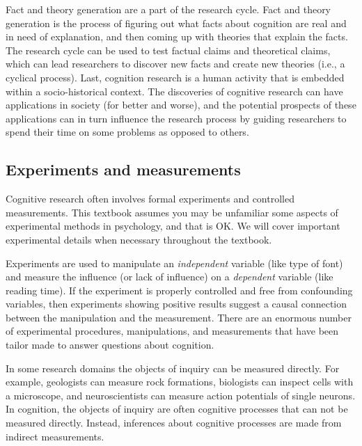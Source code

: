 \documentclass[
  oneside,
  12pt]{crumpbook}
\begin{document}
Fact and theory generation are a part of the research cycle. Fact and theory generation is the process of figuring out what facts about cognition are real and in need of explanation, and then coming up with theories that explain the facts. The research cycle can be used to test factual claims and theoretical claims, which can lead researchers to discover new facts and create new theories (i.e., a cyclical process). Last, cognition research is a human activity that is embedded within a socio-historical context. The discoveries of cognitive research can have applications in society (for better and worse), and the potential prospects of these applications can in turn influence the research process by guiding researchers to spend their time on some problems as opposed to others.

\hypertarget{experiments-and-measurements}{%
\subsection{Experiments and measurements}\label{experiments-and-measurements}}

Cognitive research often involves formal experiments and controlled measurements. This textbook assumes you may be unfamiliar some aspects of experimental methods in psychology, and that is OK. We will cover important experimental details when necessary throughout the textbook.

Experiments are used to manipulate an \emph{independent} variable (like type of font) and measure the influence (or lack of influence) on a \emph{dependent} variable (like reading time). If the experiment is properly controlled and free from confounding variables, then experiments showing positive results suggest a causal connection between the manipulation and the measurement. There are an enormous number of experimental procedures, manipulations, and measurements that have been tailor made to answer questions about cognition.

In some research domains the objects of inquiry can be measured directly. For example, geologists can measure rock formations, biologists can inspect cells with a microscope, and neuroscientists can measure action potentials of single neurons. In cognition, the objects of inquiry are often cognitive processes that can not be measured directly. Instead, inferences about cognitive processes are made from indirect measurements.
\end{document}
